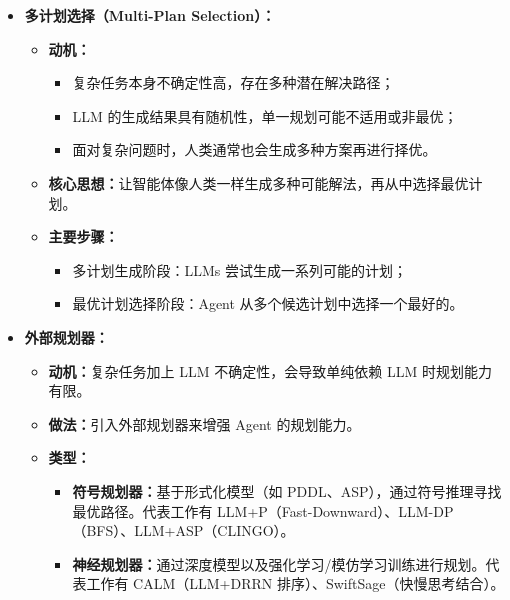 \documentclass[../main.tex]{subfiles}
\begin{document}
\begin{enumerate}
\begin{itemize}
            \item \textbf{多计划选择（Multi-Plan Selection）：}
            \begin{itemize}
                \item \textbf{动机：}
                \begin{itemize}
                    \item 复杂任务本身不确定性高，存在多种潜在解决路径；
                    \item LLM 的生成结果具有随机性，单一规划可能不适用或非最优；
                    \item 面对复杂问题时，人类通常也会生成多种方案再进行择优。
                \end{itemize}
                \item \textbf{核心思想：}让智能体像人类一样生成多种可能解法，再从中选择最优计划。
                \item \textbf{主要步骤：}
                \begin{itemize}
                    \item 多计划生成阶段：LLMs 尝试生成一系列可能的计划；
                    \item 最优计划选择阶段：Agent 从多个候选计划中选择一个最好的。
                \end{itemize}
            \end{itemize}

            \item \textbf{外部规划器：}
            \begin{itemize}
                \item \textbf{动机：}复杂任务加上 LLM 不确定性，会导致单纯依赖 LLM 时规划能力有限。
                \item \textbf{做法：}引入外部规划器来增强 Agent 的规划能力。
                \item \textbf{类型：}
                \begin{itemize}
                    \item \textbf{符号规划器：}基于形式化模型（如 PDDL、ASP），通过符号推理寻找最优路径。代表工作有 LLM+P（Fast-Downward）、LLM-DP（BFS）、LLM+ASP（CLINGO）。
                    \item \textbf{神经规划器：}通过深度模型以及强化学习/模仿学习训练进行规划。代表工作有 CALM（LLM+DRRN 排序）、SwiftSage（快慢思考结合）。
                \end{itemize}
            \end{itemize}


\end{itemize}
\end{enumerate}
\end{document}
